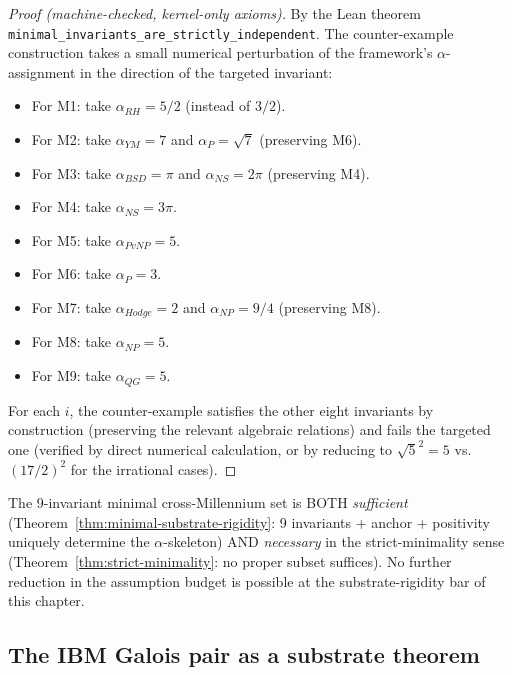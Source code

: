 \begin{proof}[Proof (machine-checked, kernel-only axioms)]
By the Lean theorem
\texttt{minimal\_\allowbreak{}invariants\_\allowbreak{}are\_\allowbreak{}strictly\_\allowbreak{}independent}. The
counter-example construction takes a small numerical perturbation of
the framework's $\alpha$-assignment in the direction of the
targeted invariant:

\begin{itemize}
\setlength{\itemsep}{0pt}
\item For M1: take $\alpha_{RH} = 5/2$ (instead of $3/2$).
\item For M2: take $\alpha_{YM} = 7$ and $\alpha_{P} = \sqrt{7}$
(preserving M6).
\item For M3: take $\alpha_{BSD} = \pi$ and $\alpha_{NS} = 2\pi$
(preserving M4).
\item For M4: take $\alpha_{NS} = 3\pi$.
\item For M5: take $\alpha_{PvNP} = 5$.
\item For M6: take $\alpha_{P} = 3$.
\item For M7: take $\alpha_{Hodge} = 2$ and $\alpha_{NP} = 9/4$
(preserving M8).
\item For M8: take $\alpha_{NP} = 5$.
\item For M9: take $\alpha_{QG} = 5$.
\end{itemize}

For each $i$, the counter-example satisfies the other eight
invariants by construction (preserving the relevant algebraic
relations) and fails the targeted one (verified by direct numerical
calculation, or by reducing to $\sqrt{5}^2 = 5$ vs.\ $(17/2)^2$ for
the irrational cases).
\end{proof}

\begin{corollary}
\label{cor:9-exactly-minimal}
The 9-invariant minimal cross-Millennium set is BOTH
\emph{sufficient} (Theorem~\ref{thm:minimal-substrate-rigidity}:
9 invariants + anchor + positivity uniquely determine the
$\alpha$-skeleton) AND \emph{necessary} in the strict-minimality
sense (Theorem~\ref{thm:strict-minimality}: no proper subset
suffices). No further reduction in the assumption budget is
possible at the substrate-rigidity bar of this chapter.
\end{corollary}

\subsection{The IBM Galois pair as a substrate theorem}
\label{subsec:ibm-galois-substrate}

